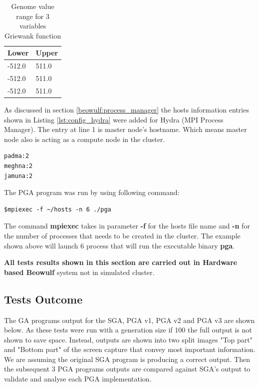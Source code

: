 \begin{table}[]
\centering
\caption{Genome value range for 3 variables Griewank function}
\label{tbl:genome_range}
\begin{tabular}{|l|l|}
\hline
\textbf{Lower} & \textbf{Upper} \\ \hline
-512.0           & 511.0            \\ \hline
-512.0           & 511.0            \\ \hline
-512.0           & 511.0            \\ \hline
\end{tabular}
\end{table}

As discussed in section \ref{beowulf:process_manager} the hosts information entries shown in Listing \ref{lst:config_hydra} were added for Hydra (MPI Process Manager). The entry at line 1 is master node's hostname. Which means master node also is acting as a compute node in the cluster.

\begin{lstlisting}[style=BashInputStyle, label={lst:config_hydra}, caption={The hosts file configuration for Hydra.}]
padma:2
meghna:2
jamuna:2
\end{lstlisting} 

The PGA program was run by using following command:
\begin{lstlisting}[style=BashInputStyle, label={lst:run_mpi}]
$mpiexec -f ~/hosts -n 6 ./pga
\end{lstlisting}
The command \textbf{mpiexec} takes in parameter \textbf{-f} for the hosts file name and \textbf{-n} for  the number of processes that needs to be created in the cluster. The example shown above will launch 6 process that will run the executable binary \textbf{pga}.

\textbf{All tests results shown in this section are carried out in Hardware based Beowulf} system not in simulated cluster.

\subsection{Tests Outcome}
The GA programs output for the SGA, PGA v1, PGA v2 and PGA v3 are shown below. As these tests were run with a generation size if 100 the full output is not shown to save space. Instead, outputs are shown into two split images "Top part" and "Bottom part" of the screen capture that convey most important information. We are assuming the original SGA program is producing a correct output. Then the subsequent 3 PGA programs outputs are compared against SGA's output to validate and analyse each PGA implementation. 

